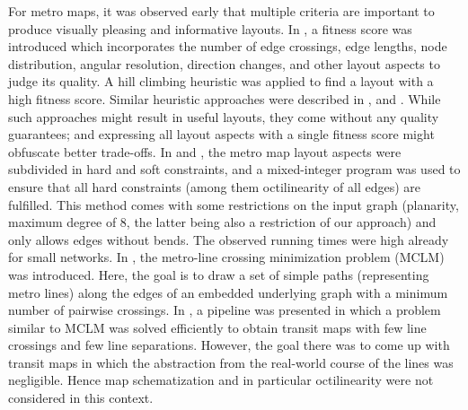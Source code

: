 \documentclass[sigconf]{acmart}
\begin{document}
For metro maps, it was observed early that multiple criteria are important to produce visually pleasing and informative layouts. In \cite{stott2004metro}, a fitness score was introduced which incorporates the number of edge crossings, edge lengths, node distribution, angular resolution, direction changes, and other layout aspects to judge its quality. A hill climbing heuristic was applied to find a layout with a high fitness score. Similar heuristic approaches were described in \cite{hong2004metro}, \cite{hong2006automatic} and  \cite{stott2010automatic}. While such approaches might result in useful layouts, they come without any quality guarantees; and expressing all layout aspects with a single fitness score might obfuscate better trade-offs. In \cite{nollenburg2005mixed} and \cite{noll11}, the metro map layout aspects were subdivided in hard and soft constraints, and a mixed-integer program was used to ensure that all hard constraints (among them octilinearity of all edges) are fulfilled. This method comes with some restrictions on the input graph (planarity, maximum degree of 8, the latter being also a restriction of our approach) and only allows edges without bends. The observed running times were high already for small networks. In \cite{benkert2006minimizing, bekos2007line}, the metro-line crossing minimization problem (MCLM) was introduced. Here, the  goal is to draw a set of simple paths (representing metro lines) along the edges of an embedded underlying graph with a minimum number of pairwise crossings. In \cite{bast2019efficient}, a pipeline was presented in which a problem similar to MCLM was solved efficiently to obtain transit maps with few line crossings and few line separations. However, the goal there was to come up with transit maps in which the abstraction from the real-world course of the lines was negligible. Hence map schematization and in particular octilinearity were not considered in this context.
\end{document}
